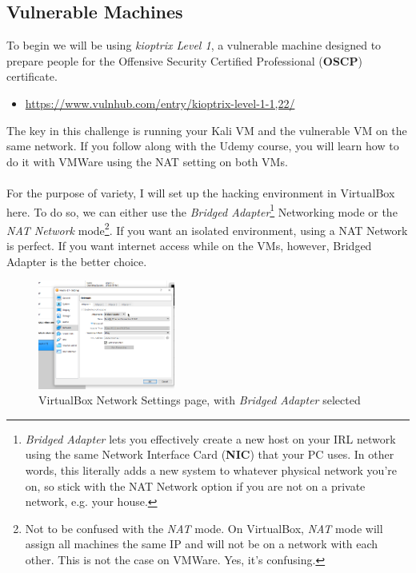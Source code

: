 \documentclass[a4paper,11pt]{article}
\begin{document}
\subsection{Vulnerable Machines}
To begin we will be using \textit{kioptrix Level 1}, a vulnerable machine designed to prepare people for the Offensive Security Certified Professional ({\bfseries OSCP}) certificate.
\begin{itemize}
    \item \url{https://www.vulnhub.com/entry/kioptrix-level-1-1,22/}
\end{itemize}
The key in this challenge is running your Kali VM and the vulnerable VM on the same network. If you follow along with the Udemy course, you will learn how to do it with VMWare using the NAT setting on both VMs.
\\
\\
For the purpose of variety, I will set up the hacking environment in VirtualBox here. To do so, we can either use the \textit{Bridged Adapter}\footnote[1]{\textit{Bridged Adapter} lets you effectively create a new host on your IRL network using the same Network Interface Card ({\bfseries NIC}) that your PC uses. In other words, this literally adds a new system to whatever physical network you're on, so stick with the NAT Network option if you are not on a private network, e.g. your house.} Networking mode or the \textit{NAT Network} mode\footnote[2]{Not to be confused with the \textit{NAT} mode. On VirtualBox, \textit{NAT} mode will assign all machines the same IP and will not be on a network with each other. This is not the case on VMWare. Yes, it's confusing.}. If you want an isolated environment, using a NAT Network is perfect. If you want internet access while on the VMs, however, Bridged Adapter is the better choice.

\begin{figure}[h]
    \centering
    \includegraphics[width=0.4\textwidth]{images/vboxsettings.png}
    \caption{VirtualBox Network Settings page, with \textit{Bridged Adapter} selected}
    \label{fig:vboxsettings}
    \vspace*{-1cm}
\end{figure}
\pagebreak
\end{document}
